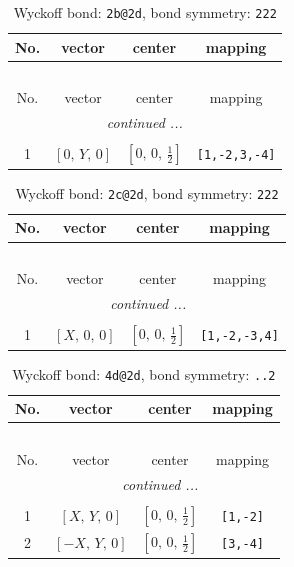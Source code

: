 \documentclass[fleqn,8pt]{jsarticle}
\begin{document}
\renewcommand{\arraystretch}{1.2}
\begin{longtable}{cccc}
\caption{Wyckoff bond: {\tt 2b@2d}, bond symmetry: {\tt 222}}
 \\
 \hline \hline
No. & vector & center & mapping \\ \hline \endfirsthead

\multicolumn{3}{l}{\tablename\ \thetable{}} \\
 \hline \hline
No. & vector & center & mapping \\ \hline \endhead

 \hline \hline
\multicolumn{3}{r}{\footnotesize\it continued ...} \\ \endfoot

 \hline \hline
\multicolumn{3}{r}{} \\ \endlastfoot

1 & $\left[ 0,\, Y,\, 0 \right]$ & $\left[ 0,\, 0,\, \frac{1}{2} \right]$ & {\tt [1,-2,3,-4]} \\
\end{longtable}
\renewcommand{\arraystretch}{1.2}
\begin{longtable}{cccc}
\caption{Wyckoff bond: {\tt 2c@2d}, bond symmetry: {\tt 222}}
 \\
 \hline \hline
No. & vector & center & mapping \\ \hline \endfirsthead

\multicolumn{3}{l}{\tablename\ \thetable{}} \\
 \hline \hline
No. & vector & center & mapping \\ \hline \endhead

 \hline \hline
\multicolumn{3}{r}{\footnotesize\it continued ...} \\ \endfoot

 \hline \hline
\multicolumn{3}{r}{} \\ \endlastfoot

1 & $\left[ X,\, 0,\, 0 \right]$ & $\left[ 0,\, 0,\, \frac{1}{2} \right]$ & {\tt [1,-2,-3,4]} \\
\end{longtable}
\renewcommand{\arraystretch}{1.2}
\begin{longtable}{cccc}
\caption{Wyckoff bond: {\tt 4d@2d}, bond symmetry: {\tt ..2}}
 \\
 \hline \hline
No. & vector & center & mapping \\ \hline \endfirsthead

\multicolumn{3}{l}{\tablename\ \thetable{}} \\
 \hline \hline
No. & vector & center & mapping \\ \hline \endhead

 \hline \hline
\multicolumn{3}{r}{\footnotesize\it continued ...} \\ \endfoot

 \hline \hline
\multicolumn{3}{r}{} \\ \endlastfoot

1 & $\left[ X,\, Y,\, 0 \right]$ & $\left[ 0,\, 0,\, \frac{1}{2} \right]$ & {\tt [1,-2]} \\ \hline
2 & $\left[ - X,\, Y,\, 0 \right]$ & $\left[ 0,\, 0,\, \frac{1}{2} \right]$ & {\tt [3,-4]} \\
\end{longtable}
\end{document}
